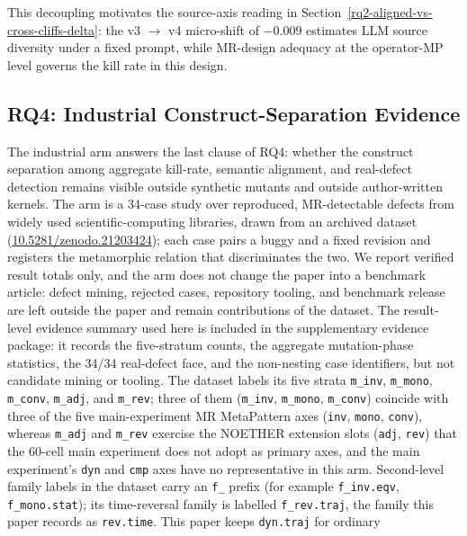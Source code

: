 \documentclass[manuscript,screen,review]{acmart}
\begin{document}
This decoupling motivates the source-axis reading in Section~\ref{rq2-aligned-vs-cross-cliffs-delta}: the v3 $\to$
v4 micro-shift of $-$0.009 estimates LLM source diversity under a fixed
prompt, while MR-design adequacy at the operator-MP level governs the
kill rate in this design.

\subsection{RQ4: Industrial Construct-Separation Evidence}\label{rq4-industrial-construct-separation}

The industrial arm answers the last clause of RQ4: whether the
construct separation among aggregate kill-rate, semantic alignment, and
real-defect detection remains visible outside synthetic mutants and
outside author-written kernels. The arm is a 34-case study over
reproduced, MR-detectable defects from widely used scientific-computing
libraries, drawn from an archived dataset
\citep{defect4mr2026}
(\href{https://doi.org/10.5281/zenodo.21203424}{10.5281/zenodo.21203424});
each case pairs a buggy and a fixed revision and registers the
metamorphic relation that discriminates the two. We report verified
result totals only, and the arm does not change the
paper into a benchmark article:
defect mining, rejected cases, repository tooling, and benchmark release
are left outside the paper and remain contributions of the dataset. The result-level evidence summary used here is included
in the supplementary evidence package: it records the five-stratum counts,
the aggregate mutation-phase statistics, the 34/34 real-defect face, and
the non-nesting case identifiers, but not candidate mining or tooling. The
dataset labels its five strata \texttt{m\_inv}, \texttt{m\_mono},
\texttt{m\_conv}, \texttt{m\_adj}, and \texttt{m\_rev}; three of them
(\texttt{m\_inv}, \texttt{m\_mono}, \texttt{m\_conv}) coincide with three
of the five main-experiment MR MetaPattern axes (\texttt{inv},
\texttt{mono}, \texttt{conv}), whereas \texttt{m\_adj} and \texttt{m\_rev}
exercise the NOETHER extension slots (\texttt{adj}, \texttt{rev}) that the
60-cell main experiment does not adopt as primary axes, and the main
experiment's \texttt{dyn} and \texttt{cmp} axes have no representative in
this arm. Second-level family labels in the dataset carry an \texttt{f\_} prefix
(for example \texttt{f\_inv.eqv}, \texttt{f\_mono.stat}); its time-reversal
family is labelled \texttt{f\_rev.traj}, the family this paper records as
\texttt{rev.time}. This paper keeps \texttt{dyn.traj} for ordinary
\end{document}
